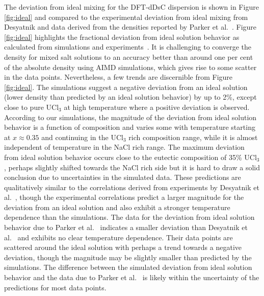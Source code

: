 \documentclass[preprint,3p,10pt,onecolumn,number,sort&compress]{elsarticle}
\begin{document}
{The deviation from ideal mixing for the DFT-dDsC dispersion is shown in Figure \ref{fig:ideal} and compared to the experimental deviation from ideal mixing from Desyatnik \cite{Desyatnik} and data derived from the densities reported by Parker et al.~\cite{Parker}. Figure \ref{fig:ideal} highlights the fractional deviation from ideal solution behavior as calculated from simulations and experiments~\cite{agca2022,Desyatnik}. It is challenging to converge the density for mixed salt solutions to an accuracy better than around one per cent of the absolute density using AIMD simulations, which gives rise to some scatter in the data points. Nevertheless, a few trends are discernible from Figure \ref{fig:ideal}. The simulations suggest a negative deviation from an ideal solution (lower density than predicted by an ideal solution behavior) by up to 2\%, except close to pure UCl$_3$ at high temperature where a positive deviation is observed. According to our simulations, the magnitude of the deviation from ideal solution behavior is a function of composition and varies some with temperature starting at $x\approx0.35$ and continuing in the UCl$_3$ rich composition range, while it is almost independent of temperature in the NaCl rich range. 
The maximum deviation from ideal solution behavior occurs close to the eutectic composition of 35\% UCl$_3$, perhaps slightly shifted towards the NaCl rich side but it is hard to draw a solid conclusion due to uncertainties in the simulated data. These predictions are qualitatively similar to the correlations derived from experiments by Desyatnik et al.~\cite{Desyatnik}, though the experimental correlations predict a larger magnitude for the deviation from an ideal solution and also exhibit a stronger temperature dependence than the simulations. The data for the deviation from ideal solution behavior due to Parker et al.~\cite{Parker} indicates a smaller deviation than Desyatnik et al.~\cite{Desyatnik} and exhibits no clear temperature dependence. Their data points are scattered around the ideal solution with perhaps  a trend towards a negative deviation, though the magnitude may be slightly smaller than predicted by the simulations. The difference between the simulated deviation from ideal solution behavior and the data due to Parker et al.~\cite{Parker} is likely within the uncertainty of the predictions for most data points.  

}
\end{document}

